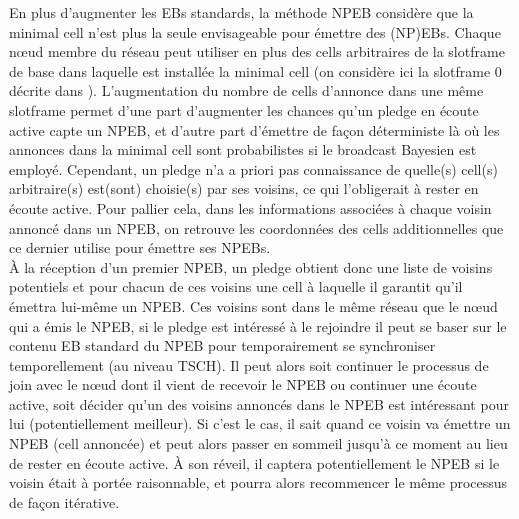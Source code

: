\documentclass[]{report}
\begin{document}
En plus d'augmenter les EBs standards, la méthode NPEB considère que la minimal cell n'est plus la seule envisageable pour émettre des (NP)EBs. Chaque nœud membre du réseau peut utiliser en plus des cells arbitraires de la slotframe de base dans laquelle est installée la minimal cell (on considère ici la slotframe 0 décrite dans \cite{rfc8180}). L'augmentation du nombre de cells d'annonce dans une même slotframe permet d'une part d'augmenter les chances qu'un pledge en écoute active capte un NPEB, et d'autre part d'émettre de façon déterministe là où les annonces dans la minimal cell sont probabilistes si le broadcast Bayesien est employé. Cependant, un pledge n'a a priori pas connaissance de quelle(s) cell(s) arbitraire(s) est(sont) choisie(s) par ses voisins, ce qui l'obligerait à rester en écoute active. Pour pallier cela, dans les informations associées à chaque voisin annoncé dans un NPEB, on retrouve les coordonnées des cells additionnelles que ce dernier utilise pour émettre ses NPEBs.\\

À la réception d'un premier NPEB, un pledge obtient donc une liste de voisins potentiels et pour chacun de ces voisins une cell à laquelle il garantit qu'il émettra lui-même un NPEB. Ces voisins sont dans le même réseau que le nœud qui a émis le NPEB, si le pledge est intéressé à le rejoindre il peut se baser sur le contenu EB standard du NPEB pour temporairement se synchroniser temporellement (au niveau TSCH). Il peut alors soit continuer le processus de join avec le nœud dont il vient de recevoir le NPEB ou continuer une écoute active, soit décider qu'un des voisins annoncés dans le NPEB est intéressant pour lui (potentiellement meilleur). Si c'est le cas, il sait quand ce voisin va émettre un NPEB (cell annoncée) et peut alors passer en sommeil jusqu'à ce moment au lieu de rester en écoute active. À son réveil, il captera potentiellement le NPEB si le voisin était à portée raisonnable, et pourra alors recommencer le même processus de façon itérative.

\newpage
\end{document}
